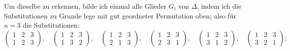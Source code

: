 \documentclass[11pt]{article}
\let\Delta\varDelta
\begin{document}
Um dieselbe zu erkennen, bilde ich einmal alle Glieder $G_i$ von $\Delta$, indem ich die Substitutionen zu Grunde lege mit gut geordneter Permutation oben; also für $n=3$ die Substitutionen:
\[
\begin{pmatrix}1&2&3\\1&2&3\end{pmatrix}, \quad
\begin{pmatrix}1&2&3\\1&3&2\end{pmatrix}, \quad
\begin{pmatrix}1&2&3\\2&1&3\end{pmatrix}, \quad
\begin{pmatrix}1&2&3\\2&3&1\end{pmatrix}, \quad
\begin{pmatrix}1&2&3\\3&1&2\end{pmatrix}, \quad
\begin{pmatrix}1&2&3\\3&2&1\end{pmatrix};
\]
\end{document}
